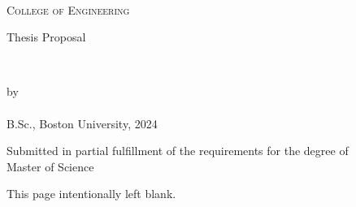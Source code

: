 
\begin{titlepage}
    \begin{center}
        \begin{doublespace}
             \\
            \textsc{\Large College of Engineering} \\
        \end{doublespace}
        \vfill
        {\large Thesis Proposal}\\
        \vfill
        \begin{spacing}{1.5}
            \textbf{\textsc{\huge\thesisName}} \\
        \end{spacing}
        \vfill
        by \\
        \vfill
        \textbf{\LARGE\authorName} \\ \vspace{2.5pt}
        {\Large B.Sc., Boston University, 2024} \\
        \vfill
        \begin{doublespace}
            Submitted in partial fulfillment of the requirements for the degree of\\
            \large Master of Science\\
            \the\year
        \end{doublespace}
    \end{center}
\end{titlepage}

\newpage
    \begin{center}
        This page intentionally left blank.
    \end{center}
    \cleardoublepage

    \tableofcontents
\cleardoublepage

\setcounter{page}{1}
